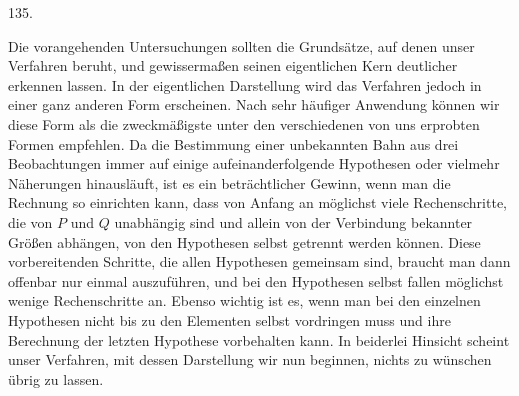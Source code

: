 \par{}\medskip
\begin{center}\hypertarget{native-181-article135}{}135.\end{center}
Die vorangehenden Untersuchungen sollten die Grundsätze, auf denen unser Verfahren beruht, und
gewissermaßen seinen eigentlichen Kern deutlicher erkennen lassen. In der eigentlichen
Darstellung wird das Verfahren jedoch in einer ganz anderen Form erscheinen. Nach sehr häufiger
Anwendung können wir diese Form als die zweckmäßigste unter den verschiedenen von uns erprobten
Formen empfehlen. Da die Bestimmung einer unbekannten Bahn aus drei Beobachtungen immer auf
einige aufeinanderfolgende Hypothesen oder vielmehr Näherungen hinausläuft, ist es ein
beträchtlicher Gewinn, wenn man die Rechnung so einrichten kann, dass von Anfang an möglichst
viele Rechenschritte, die von $P$ und $Q$ unabhängig sind und allein von der Verbindung
bekannter Größen abhängen, von den Hypothesen selbst getrennt werden können. Diese
vorbereitenden Schritte, die allen Hypothesen gemeinsam sind, braucht man dann offenbar nur
einmal auszuführen, und bei den Hypothesen selbst fallen möglichst wenige Rechenschritte an.
Ebenso wichtig ist es, wenn man bei den einzelnen Hypothesen nicht bis zu den Elementen selbst
vordringen muss und ihre Berechnung der \hypertarget{native-182}{}letzten Hypothese vorbehalten kann. In beiderlei
Hinsicht scheint unser Verfahren, mit dessen Darstellung wir nun beginnen, nichts zu wünschen
übrig zu lassen.
